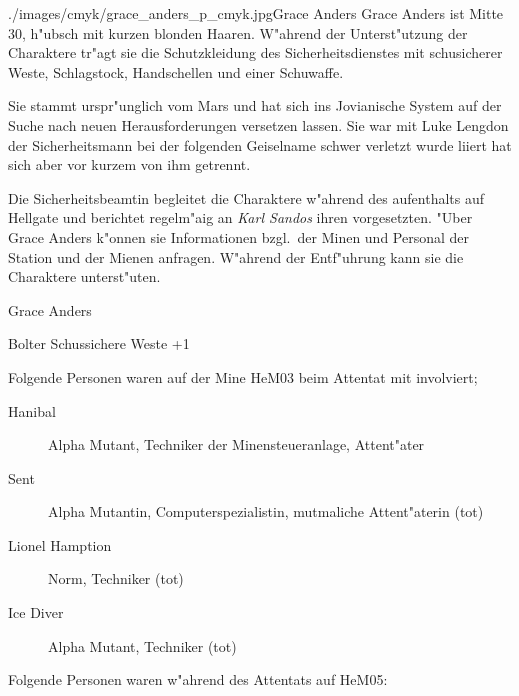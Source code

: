 \begin{sideimagebox}[l]{0.5}{./images/cmyk/grace_anders_p_cmyk.jpg}{Grace Anders}
    Grace Anders ist Mitte 30, h"ubsch mit kurzen blonden Haaren. W"ahrend der Unterst"utzung der Charaktere tr"agt sie 
    die Schutzkleidung des Sicherheitsdienstes mit schu\3sicherer Weste, Schlagstock, Handschellen und einer Schu\3waffe. 

    Sie stammt urspr"unglich vom Mars und hat sich ins Jovianische System auf der Suche nach neuen Herausforderungen 
    versetzen lassen. Sie war mit Luke Lengdon der Sicherheitsmann bei der folgenden Geiselname schwer verletzt wurde 
    liiert hat sich aber vor kurzem von ihm getrennt.

    Die Sicherheitsbeamtin begleitet die Charaktere w"ahrend des aufenthalts auf Hellgate und berichtet regelm"a\3ig an 
    \emph{Karl Sandos} ihren vorgesetzten. "Uber Grace Anders k"onnen sie Informationen bzgl.~der Minen und Personal der 
    Station und der Mienen anfragen. W"ahrend der Entf"uhrung kann sie die Charaktere unterst"uten.
\end{sideimagebox}

\begin{nscsheet}{Grace Anders}
    \nscstats[ATT=2,AGG=2,COM=2]
    \nscruler
    \begin{nscinventory}
        \nscitem[Waffen] Bolter
        \nscitem[R"ustung] Schussichere Weste +1
    \end{nscinventory}
\end{nscsheet}


Folgende Personen waren auf der Mine HeM03 beim Attentat mit involviert;

\begin{description}
    \item[Hanibal] Alpha Mutant, Techniker der Minensteueranlage, Attent"ater
    \item[Sent] Alpha Mutantin, Computerspezialistin, mutma\3liche Attent"aterin (tot)
    \item[Lionel Hamption] Norm, Techniker (tot)
    \item[Ice Diver] Alpha Mutant, Techniker (tot) 
\end{description}


Folgende Personen waren w"ahrend des Attentats auf HeM05:

